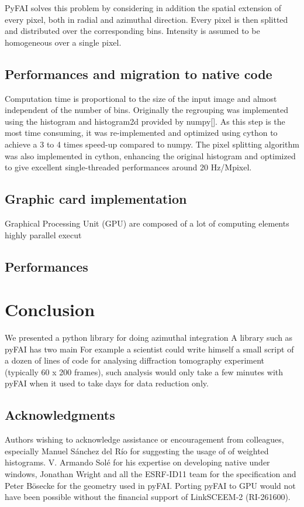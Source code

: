 \documentclass[a4paper]{jpconf}
\begin{document}
PyFAI solves this problem by considering in addition the spatial extension of
every pixel, both in radial    and azimuthal direction. Every pixel is then splitted and distributed over the corresponding bins. Intensity is assumed to be homogeneous over a single pixel.
\subsection{Performances and migration to native code}
Computation time is proportional to the size of the input image and almost
independent  of the number of bins. Originally the regrouping was implemented 
using the histogram and histogram2d provided by numpy[]. As this step is the
most  time consuming, it was re-implemented and optimized using cython to
achieve  a  3 to 4 times speed-up compared to numpy.
The pixel splitting algorithm was also implemented in cython, enhancing the 
original histogram and optimized to give excellent single-threaded performances 
around 20 Hz/Mpixel.

\subsection{Graphic card implementation}
Graphical Processing Unit (GPU) are composed of a lot of computing elements highly parallel execut
\subsection{Performances}
\section{Conclusion}
We presented a python library for doing azimuthal integration 
A library such as pyFAI has two main 
For example a scientist could write himself a small script of a dozen of lines
of code for  analysing diffraction tomography experiment (typically 60 x 200
frames),  such analysis would only take a few minutes with pyFAI when it used to take days for data reduction only.
 
\subsection{Acknowledgments}
Authors wishing to acknowledge assistance or encouragement from 
colleagues, especially Manuel S\'anchez del R\'io for suggesting the usage of
of weighted histograms.
V. Armando Sol\'e for his expertise on developing native under windows, Jonathan
Wright and all the ESRF-ID11 team for the specification and Peter B\"osecke for
the geometry used in pyFAI. Porting pyFAI to GPU would not have been
possible without the financial support of LinkSCEEM-2 (RI-261600).
\end{document}
